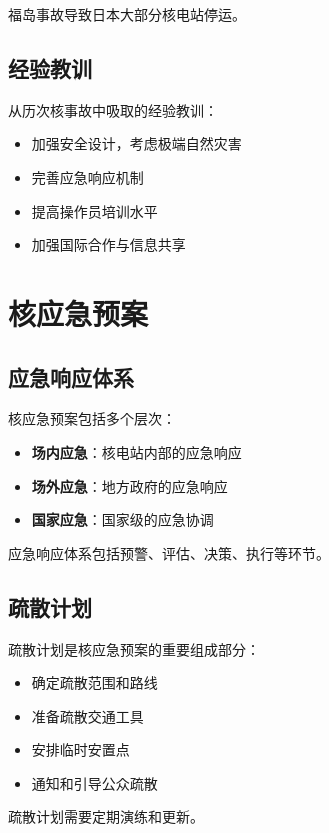 \documentclass[12pt,UTF8]{ctexbook}
\begin{document}
福岛事故导致日本大部分核电站停运。

\section{经验教训}

从历次核事故中吸取的经验教训：

\begin{itemize}[leftmargin=2cm]
    \item 加强安全设计，考虑极端自然灾害
    \item 完善应急响应机制
    \item 提高操作员培训水平
    \item 加强国际合作与信息共享
\end{itemize}

\chapter{核应急预案}

\section{应急响应体系}

核应急预案包括多个层次：

\begin{itemize}[leftmargin=2cm]
    \item \textbf{场内应急}：核电站内部的应急响应
    \item \textbf{场外应急}：地方政府的应急响应
    \item \textbf{国家应急}：国家级的应急协调
\end{itemize}

应急响应体系包括预警、评估、决策、执行等环节。

\section{疏散计划}

疏散计划是核应急预案的重要组成部分：

\begin{itemize}[leftmargin=2cm]
    \item 确定疏散范围和路线
    \item 准备疏散交通工具
    \item 安排临时安置点
    \item 通知和引导公众疏散
\end{itemize}

疏散计划需要定期演练和更新。
\end{document}
